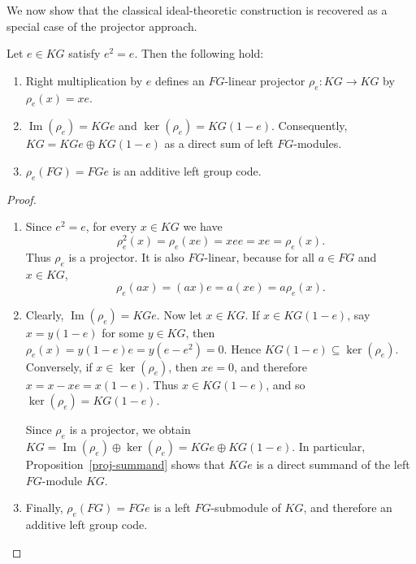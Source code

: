 \documentclass[11pt]{article}
\begin{document}
We now show that the classical ideal-theoretic construction is recovered as a special case of the projector approach.

\begin{proposition}\label{idempotent-projector}
Let $e\in KG$ satisfy $e^2=e$. Then the following hold:
\begin{enumerate}
    \item Right multiplication by $e$ defines an $FG$-linear projector $\rho_e:KG\longrightarrow KG$ by $\rho_e(x)=xe$.
    \item $
\operatorname{Im}(\rho_e)=KGe$ and $
\ker(\rho_e)=KG(1-e).
$ Consequently,
$
KG=KGe\oplus KG(1-e)
$
as a direct sum of left $FG$-modules.
\item $
\rho_e(FG)=FGe$ is an additive left group code.
\end{enumerate}
\end{proposition}

\begin{proof} \begin{enumerate}
\item Since $e^2=e$, for every $x\in KG$ we have
$$
\rho_e^2(x)=\rho_e(xe)=xee=xe=\rho_e(x).
$$
Thus $\rho_e$ is a projector. It is also $FG$-linear, because for all $a\in FG$ and $x\in KG$,
$$
\rho_e(ax)=(ax)e=a(xe)=a\rho_e(x).
$$
\item Clearly, $\operatorname{Im}(\rho_e)=KGe$. Now let $x\in KG$. If $x\in KG(1-e)$, say $x=y(1-e)$ for some $y\in KG$, then
$
\rho_e(x)=y(1-e)e=y(e-e^2)=0.
$
Hence $KG(1-e)\subseteq \ker(\rho_e)$. Conversely, if $x\in \ker(\rho_e)$, then $xe=0$, and therefore
$
x=x-xe=x(1-e).
$
Thus $x\in KG(1-e)$, and so $\ker(\rho_e)=KG(1-e)$.

Since $\rho_e$ is a projector, we obtain
$
KG=\operatorname{Im}(\rho_e)\oplus\ker(\rho_e)=KGe\oplus KG(1-e).
$
In particular, Proposition~\ref{proj-summand} shows that $KGe$ is a direct summand of the left $FG$-module $KG$.
\item Finally, $\rho_e(FG)=FGe$ is a left $FG$-submodule of $KG$, and therefore an additive left group code.
\end{enumerate}
\end{proof}
\end{document}
